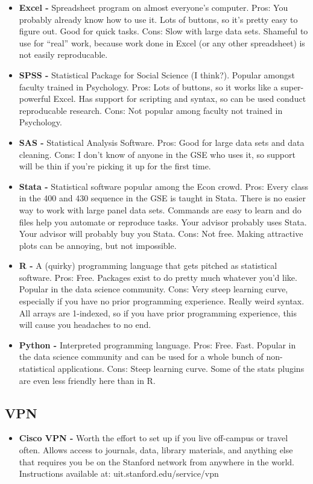 \documentclass[11pt]{article}
\theoremstyle{definition}
\theoremstyle{remark}
\begin{document}
    	\begin{itemize}
        	\item \textbf{Excel - } Spreadsheet program on almost everyone's computer.  Pros: You probably already know how to use it.  Lots of buttons, so it's pretty easy to figure out.  Good for quick tasks.  Cons: Slow with large data sets.  Shameful to use for ``real'' work, because work done in Excel (or any other spreadsheet) is not easily reproducable. 
            \item \textbf{SPSS - } Statistical Package for Social Science (I think?).  Popular amongst faculty trained in Psychology.  Pros: Lots of buttons, so it works like a super-powerful Excel.  Has support for scripting and syntax, so can be used conduct reproducable research.  Cons: Not popular among faculty not trained in Psychology.
            \item \textbf{SAS - } Statistical Analysis Software.  Pros: Good for large data sets and data cleaning.  Cons: I don't know of anyone in the GSE who uses it, so support will be thin if you're picking it up for the first time.
        	\item \textbf{Stata - } Statistical software popular among the Econ crowd.  Pros: Every class in the 400 and 430 sequence in the GSE is taught in Stata.  There is no easier way to work with large panel data sets. Commands are easy to learn and do files help you automate or reproduce tasks.  Your advisor probably uses Stata. Your advisor will probably buy you Stata.  Cons:  Not free.  Making attractive plots can be annoying, but not impossible.
            \item \textbf{R - } A (quirky) programming language that gets pitched as statistical software.  Pros: Free.  Packages exist to do pretty much whatever you'd like.  Popular in the data science community.  Cons:  Very steep learning curve, especially if you have no prior programming experience. Really weird syntax.  All arrays are 1-indexed, so if you have prior programming experience, this will cause you headaches to no end. 
            \item \textbf{Python - } Interpreted programming language.  Pros: Free. Fast. Popular in the data science community and can be used for a whole bunch of non-statistical applications.  Cons: Steep learning curve.  Some of the stats plugins are even less friendly here than in R.
        \end{itemize}
        
    \subsection{VPN}
		\begin{itemize}
        	\item \textbf{Cisco VPN - } Worth the effort to set up if you live off-campus or travel often.  Allows access to journals, data, library materials, and anything else that requires you be on the Stanford network from anywhere in the world. Instructions available at:  uit.stanford.edu/service/vpn 
        \end{itemize}
\end{document}
